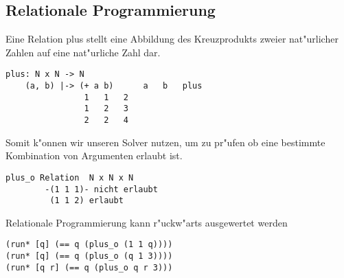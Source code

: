 \subsection{Relationale Programmierung}

Eine Relation plus stellt eine Abbildung des Kreuzprodukts zweier nat"urlicher Zahlen auf eine nat"urliche Zahl dar.

\begin{lstlisting}
plus: N x N -> N
    (a, b) |-> (+ a b)		a   b   plus
				1   1   2
				1   2   3
				2   2   4
\end{lstlisting}

Somit k"onnen wir unseren Solver nutzen, um zu pr"ufen ob eine bestimmte Kombination von Argumenten erlaubt ist.
\begin{lstlisting}
plus_o Relation	 N x N x N
		-(1 1 1)- nicht erlaubt
		 (1 1 2) erlaubt
\end{lstlisting}

Relationale Programmierung kann r"uckw"arts ausgewertet werden

\begin{lstlisting}
(run* [q] (== q (plus_o (1 1 q))))
(run* [q] (== q (plus_o (q 1 3))))
(run* [q r] (== q (plus_o q r 3)))
\end{lstlisting}

